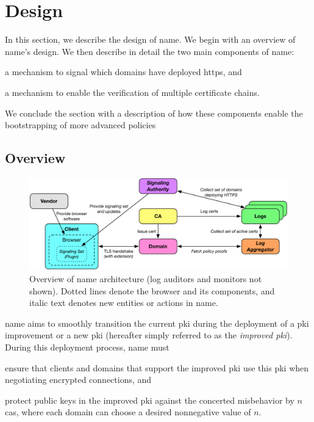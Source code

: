 \section{Design}
\label{sec:design}

In this section, we describe the design of \ac{name}. We begin with an overview
of \ac{name}'s design. We then describe in detail the two main components of
\ac{name}:
\begin{inparaenum}[(1)]
\item a mechanism to signal which domains have deployed \ac{https}, and
\item a mechanism to enable the verification of multiple certificate chains.
\end{inparaenum}
We conclude the section with a description of how these components enable the
bootstrapping of more advanced policies 

\subsection{Overview}
\label{sec:design:overview}

\begin{figure}
  \centering
  \includegraphics[width=\linewidth]{fig/overview2}
  \caption{Overview of \ac{name} architecture (log auditors and monitors not
  shown). Dotted lines denote the browser and its components, and italic text
denotes new entities or actions in \ac{name}.}
  \label{fig:overview}
\end{figure}


\ac{name} aims to smoothly transition the current \ac{pki} during the deployment
of a \ac{pki} improvement or a new \ac{pki} (hereafter simply referred to as the
\emph{improved \ac{pki}}). During this deployment process, \ac{name} must
\begin{inparaenum}[(1)]
\item ensure that clients and domains that support the improved \ac{pki} use
  this \ac{pki} when negotiating encrypted connections, and
\item protect public keys in the improved \ac{pki} against the concerted
  misbehavior by $n$ \acp{ca}, where each domain can choose a desired
  nonnegative value of $n$.
\end{inparaenum}

